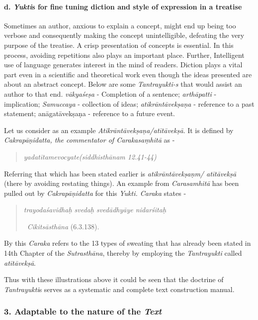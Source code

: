 \paragraph*{d. \textit{Yukti}s for fine tuning diction and style of expression in a treatise}

Sometimes an author, anxious to explain a concept, might end up being too verbose and consequently making the concept unintelligible, defeating the very purpose of the treatise. A crisp presentation of concepts is essential. In this process, avoiding repetitions also plays an important place. Further, Intelligent use of language generates interest in the mind of readers. Diction plays a vital part even in a scientific and theoretical work even though the ideas presented are about an abstract concept. Below are some \textit{Tantrayukti-s} that would assist an author to that end. \textit{vākyaśeṣa} - Completion of a sentence; \textit{arthāpatti} - implication; \textit{Samuccaya} - collection of ideas; \textit{atikrāntāvekṣaṇa} - reference to a past statement; anāgatāvekṣaṇa - reference to a future event.

Let us consider as an example \textit{Atikrāntāvekṣaṇa/atītāvekṣā}. It is defined by \textit{Cakrapāṇidatta, the commentator of Carakasaṃhitā} as -

\begin{verse}
\textit{yadatītamevocyate}\hfill \textit{(siddhisthānam 12.41-44)}
\end{verse}

Referring that which has been stated earlier is \textit{atikrāntāvekṣaṇm/ atītāvekṣā} (there by avoiding restating things). An example from \textit{Carasamhitā} has been pulled out by \textit{Cakrapāṇidatta} for this \textit{Yukti. Caraka} states -

\begin{verse}
\textit{trayodaśavidhaḥ svedaḥ svedādhyāye nidarśitaḥ}

~\hfill \textit{Cikitsāsthāna} (6.3.138).
\end{verse}

By this \textit{Caraka} refers to the 13 types of sweating that has already been stated in 14th Chapter of the \textit{Sutrasthāna}, thereby by employing the \textit{Tantrayukti} called\textit{ atītāvekṣā}.

Thus with these illustrations above it could be seen that the doctrine of \textit{Tantrayukti}s serves as a systematic and complete text construction manual.


\subsubsection*{3. Adaptable to the nature of the \textit{Text}}

